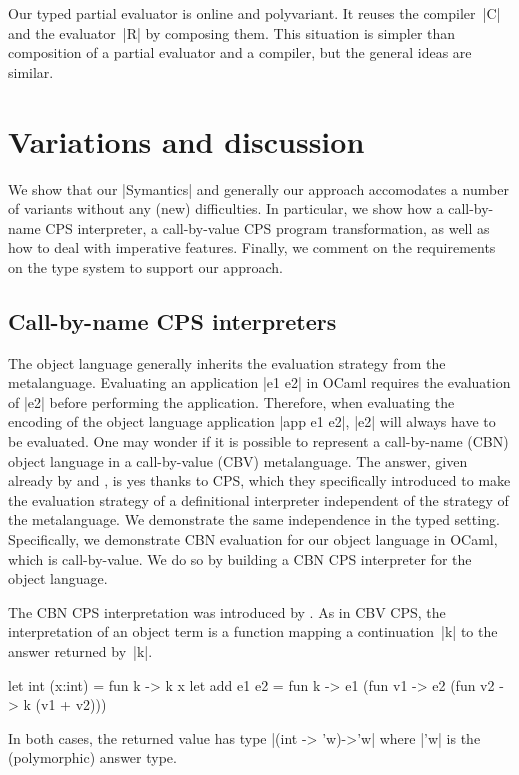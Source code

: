 \documentclass[preprint]{sigplanconf}
\begin{document}
Our typed partial evaluator is online and polyvariant.  It reuses the
compiler~|C| and the evaluator~|R| by composing them.  This situation is
simpler than  composition of a partial
evaluator and a compiler, but the general ideas are similar.

\section{Variations and discussion}\label{discussion}

We show that our |Symantics| and generally our approach accomodates
a number of variants without any (new) difficulties.  In particular,
we show how a call-by-name CPS interpreter, a call-by-value CPS
program transformation, as well as how to deal with imperative features.
Finally, we comment on the requirements on the type system to support 
our approach.

\subsection{Call-by-name CPS interpreters}\label{S:CPS}

The object language generally inherits the evaluation strategy from
the metalanguage. Evaluating an application |e1 e2| in OCaml requires
the evaluation of |e2| before performing the application. Therefore,
when evaluating the encoding of the object language application 
|app e1 e2|, |e2| will always have to be evaluated. One may wonder if it is
possible to represent a call-by-name (CBN) object language in a
call-by-value (CBV) metalanguage. The answer, given already by 
\citet{reynolds-definitional,reynolds-relation} and \citet{PlotkinCBN}, is yes thanks to CPS, which they
specifically introduced 
to make the evaluation strategy of a definitional interpreter
independent of the strategy of the metalanguage. We demonstrate the
same independence in the typed setting. Specifically, we
demonstrate CBN evaluation for our object language in OCaml, which is
call-by-value. We do so by building a CBN CPS interpreter for the object
language.

The CBN CPS interpretation was introduced by \citet{PlotkinCBN}. As in
CBV CPS, the interpretation of an object term is a function
mapping a continuation~|k| to the answer
returned by~|k|.
\begin{code}
let int (x:int) = fun k -> k x
let add e1 e2 = fun k ->
  e1 (fun v1 -> e2 (fun v2 -> k (v1 + v2)))
\end{code}
In both cases, the returned value has type 
|(int -> 'w)->'w| where |'w| is the (polymorphic) answer type.
\end{document}
